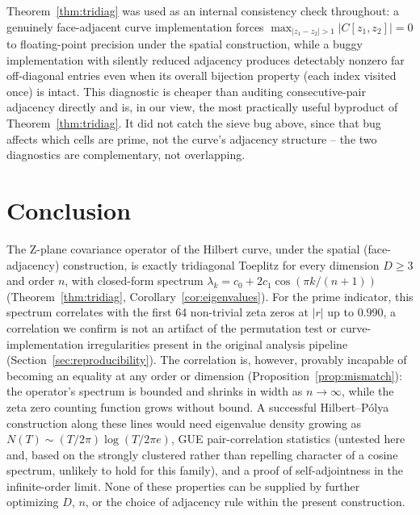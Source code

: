\documentclass[11pt,a4paper]{article}
\begin{document}
Theorem~\ref{thm:tridiag} was used as an internal consistency check
throughout: a genuinely face-adjacent curve implementation forces
$\max_{|z_1-z_2|>1}|C[z_1,z_2]|=0$ to floating-point precision under the
spatial construction, while a buggy implementation with silently reduced
adjacency produces detectably nonzero far off-diagonal entries even when
its overall bijection property (each index visited once) is intact. This
diagnostic is cheaper than auditing consecutive-pair adjacency directly and
is, in our view, the most practically useful byproduct of
Theorem~\ref{thm:tridiag}. It did not catch the sieve bug above, since that
bug affects which cells are prime, not the curve's adjacency structure --
the two diagnostics are complementary, not overlapping.

\section{Conclusion}

The Z-plane covariance operator of the Hilbert curve, under the spatial
(face-adjacency) construction, is exactly tridiagonal Toeplitz for every
dimension $D\ge3$ and order $n$, with closed-form spectrum
$\lambda_k=c_0+2c_1\cos(\pi k/(n+1))$ (Theorem~\ref{thm:tridiag},
Corollary~\ref{cor:eigenvalues}). For the prime indicator, this spectrum
correlates with the first 64 non-trivial zeta zeros at $|r|$ up to $0.990$,
a correlation we confirm is not an artifact of the permutation test or
curve-implementation irregularities present in the original analysis
pipeline (Section~\ref{sec:reproducibility}). The correlation is, however,
provably incapable of becoming an equality at any order or dimension
(Proposition~\ref{prop:mismatch}): the operator's spectrum is bounded and
shrinks in width as $n\to\infty$, while the zeta zero counting function
grows without bound. A successful Hilbert--P\'{o}lya construction along
these lines would need eigenvalue density growing as $N(T)\sim
(T/2\pi)\log(T/2\pi e)$, GUE pair-correlation statistics (untested here and,
based on the strongly clustered rather than repelling character of a cosine
spectrum, unlikely to hold for this family), and a proof of self-adjointness
in the infinite-order limit. None of these properties can be supplied by
further optimizing $D$, $n$, or the choice of adjacency rule within the
present construction.
\end{document}
